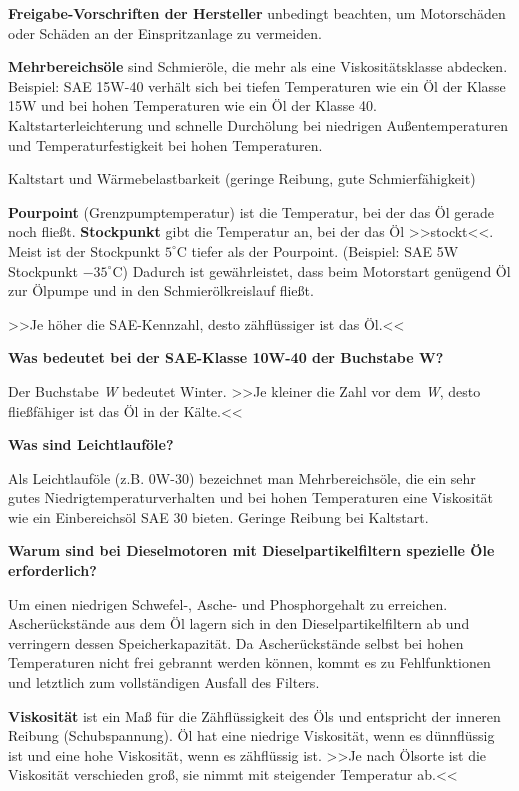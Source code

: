 \textbf{Freigabe-Vorschriften der Hersteller} unbedingt beachten, um
Motorschäden oder Schäden an der Einspritzanlage zu vermeiden.

\textbf{Mehrbereichsöle} sind Schmieröle, die mehr als eine
Viskositätsklasse abdecken. Beispiel: SAE 15W-40 verhält sich bei tiefen
Temperaturen wie ein Öl der Klasse 15W und bei hohen Temperaturen wie
ein Öl der Klasse 40. Kaltstarterleichterung und schnelle Durchölung bei
niedrigen Außentemperaturen und Temperaturfestigkeit bei hohen
Temperaturen.

Kaltstart und Wärmebelastbarkeit (geringe Reibung, gute
Schmierfähigkeit)

\textbf{Pourpoint} (Grenzpumptemperatur) ist die Temperatur, bei der das
Öl gerade noch fließt. \textbf{Stockpunkt} gibt die Temperatur an, bei
der das Öl >>stockt<<. Meist ist der Stockpunkt $5^\circ\text{C}$
tiefer als der Pourpoint. (Beispiel: SAE 5W Stockpunkt
$- 35^\circ\text{C}$) Dadurch ist gewährleistet, dass beim Motorstart
genügend Öl zur Ölpumpe und in den Schmierölkreislauf fließt.

>>Je höher die SAE-Kennzahl, desto zähflüssiger ist das Öl.<<

\textbf{Was bedeutet bei der SAE-Klasse 10W-40 der Buchstabe W?}

Der Buchstabe \emph{W} bedeutet Winter. >>Je kleiner die Zahl vor dem
\emph{W}, desto fließfähiger ist das Öl in der Kälte.<<

\textbf{Was sind Leichtlauföle?}

Als Leichtlauföle (z.B. 0W-30) bezeichnet man Mehrbereichsöle, die ein
sehr gutes Niedrigtemperaturverhalten und bei hohen Temperaturen eine
Viskosität wie ein Einbereichsöl SAE 30 bieten. Geringe Reibung bei
Kaltstart.

\textbf{Warum sind bei Dieselmotoren mit Dieselpartikelfiltern spezielle
Öle erforderlich?}

Um einen niedrigen Schwefel-, Asche- und Phosphorgehalt zu erreichen.
Ascherückstände aus dem Öl lagern sich in den Dieselpartikelfiltern ab
und verringern dessen Speicherkapazität. Da Ascherückstände selbst bei
hohen Temperaturen nicht frei gebrannt werden können, kommt es zu
Fehlfunktionen und letztlich zum vollständigen Ausfall des Filters.

\textbf{Viskosität} ist ein Maß für die Zähflüssigkeit des Öls und
entspricht der inneren Reibung (Schubspannung). Öl hat eine niedrige
Viskosität, wenn es dünnflüssig ist und eine hohe Viskosität, wenn es
zähflüssig ist. >>Je nach Ölsorte ist die Viskosität verschieden groß,
sie nimmt mit steigender Temperatur ab.<<

